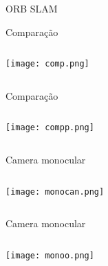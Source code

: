 \begin{frame}[c]{ORB SLAM}
    \centering


\end{frame}
\begin{frame}[t]{Comparação}
    \transboxout[duration=0.5]
    \begin{columns}
            \texttt{[image: comp.png]}       
    \end{columns}
\end{frame}
\begin{frame}[t]{Comparação}
    \transboxout[duration=0.5]
    \begin{columns}
            \texttt{[image: compp.png]}       
    \end{columns}
\end{frame}
\begin{frame}[t]{Camera monocular}
    \transboxout[duration=0.5]
    \begin{columns}
            \texttt{[image: monocan.png]}
    \end{columns}
\end{frame}
\begin{frame}[t]{Camera monocular}
    \transboxout[duration=0.5]
    \begin{columns}
            \texttt{[image: monoo.png]}
    \end{columns}
\end{frame}

